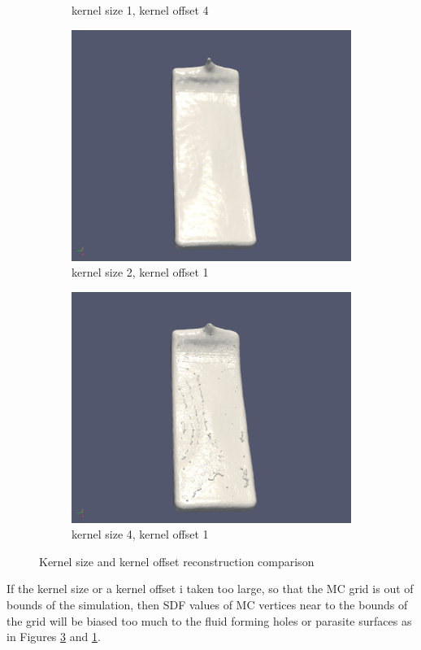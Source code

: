 \begin{figure}[H]
\begin{subfigure}[b]{0.5\textwidth}
               \caption{kernel size 1, kernel offset 4}
               \label{fig:ks1ko4}
        \end{subfigure}
        \begin{subfigure}[b]{0.5\textwidth}
               \includegraphics[width=\textwidth]{figures/DBBlur_ks-2_ko-1.png}
               \caption{kernel size 2, kernel offset 1}
               \label{fig:ks2ko1}
        \end{subfigure}        
        \begin{subfigure}[b]{0.5\textwidth}
               \includegraphics[width=\textwidth]{figures/DBBlur_ks-4_ko-1.png}
               \caption{kernel size 4, kernel offset 1}
               \label{fig:ks4ko1}
        \end{subfigure}
        \caption{Kernel size and kernel offset reconstruction comparison}
        \label{fig:ksko}
\end{figure}
If the kernel size or a kernel offset i taken too large, so that the MC grid is out of bounds of the simulation, then SDF values of MC vertices near to the bounds of the grid will be biased too much to the fluid forming holes or parasite surfaces as in Figures \ref{fig:ks4ko1} and \ref{fig:ks1ko4}.
